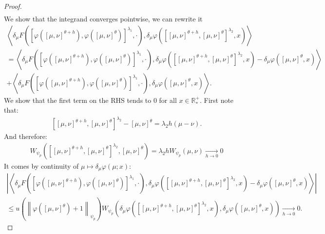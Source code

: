 \documentclass[11pt,a4paper]{article}
\newcommand{\RRP}{\mathbb{R}^+_*}
\newcommand{\brac}[1]{\left\langle#1\right\rangle}
\begin{document}
\begin{proof}
\begin{multline*}
    \end{multline*}
    We show that the integrand converges pointwise, we can rewrite it
    \begin{multline*}
        \brac{\delta_\mu F\left(\left[\varphi\left([\mu,\nu]^{\theta + h}\right),\varphi\left([\mu,\nu]^{\theta}\right)\right]^{\lambda_1}, \cdot \right),\delta_\mu \varphi\left(\left[ [\mu,\nu]^{\theta + h}, [\mu,\nu]^{\theta }\right]^{\lambda_2} ,x\right)} \\
        = \brac{\delta_\mu F\left(\left[\varphi\left([\mu,\nu]^{\theta + h}\right),\varphi\left([\mu,\nu]^{\theta}\right)\right]^{\lambda_1}, \cdot \right),\delta_\mu \varphi\left(\left[ [\mu,\nu]^{\theta + h}, [\mu,\nu]^{\theta }\right]^{\lambda_2} ,x\right) - \delta_\mu \varphi\left([\mu,\nu]^{\theta } ,x\right)} \\
        + \brac{\delta_\mu F\left(\left[\varphi\left([\mu,\nu]^{\theta + h}\right),\varphi\left([\mu,\nu]^{\theta}\right)\right]^{\lambda_1}, \cdot \right) ,\delta_\mu \varphi\left([\mu,\nu]^{\theta } ,x\right)}.
    \end{multline*}
    We show that the first term on the RHS tends to $0$ for all $x \in \RRP$. First note that:
    \begin{align*}
        \left[ [\mu,\nu]^{\theta + h}, [\mu,\nu]^{\theta }\right]^{\lambda_2} - [\mu,\nu]^{\theta } = \lambda_2 h (\mu - \nu).
    \end{align*}
    And therefore:
    \begin{align*}
        W_{\psi_p}\left(\left[ [\mu,\nu]^{\theta + h}, [\mu,\nu]^{\theta }\right]^{\lambda_2},[\mu,\nu]^{\theta } \right) = \lambda_2 h W_{\psi_p}\left(\mu,\nu\right) \xrightarrow[h \to 0]{} 0
    \end{align*}
    It comes by continuity of $\mu \mapsto \delta_{\mu} \varphi(\mu;x)$:
    \begin{multline*}
        \left| \brac{\delta_\mu F\left(\left[\varphi\left([\mu,\nu]^{\theta + h}\right),\varphi\left([\mu,\nu]^{\theta}\right)\right]^{\lambda_1}, \cdot \right),\delta_\mu \varphi\left(\left[ [\mu,\nu]^{\theta + h}, [\mu,\nu]^{\theta }\right]^{\lambda_2} ,x\right) - \delta_\mu \varphi\left([\mu,\nu]^{\theta } ,x\right)} \right|\\
        \leq u\left(\left\|\varphi\left([\mu,\nu]^{\theta }\right)+ 1\right\|_{\psi_p}\right) W_{\psi_p} \left(\delta_\mu \varphi\left(\left[ [\mu,\nu]^{\theta + h}, [\mu,\nu]^{\theta }\right]^{\lambda_2} ,x\right) , \delta_\mu \varphi\left([\mu,\nu]^{\theta } ,x\right) \right) 
        \xrightarrow[h \to 0]{} 0.

\end{multline*}
\end{proof}
\end{document}

